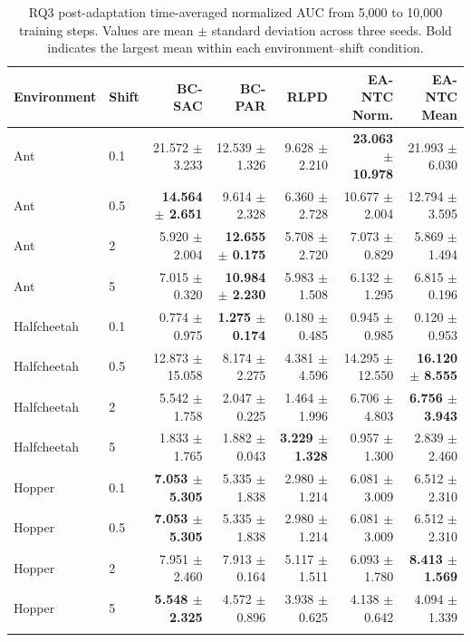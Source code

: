 \begin{table}[t]
\centering
\caption{RQ3 post-adaptation time-averaged normalized AUC from 5,000 to 10,000 training steps. Values are mean $\pm$ standard deviation across three seeds. Bold indicates the largest mean within each environment--shift condition.}
\label{tab:rq3_post_adaptation_auc}
\small
\setlength{\tabcolsep}{4pt}
\begin{tabular}{llrrrrr}
\toprule
Environment & Shift & BC-SAC & BC-PAR & RLPD & EA-NTC Norm. & EA-NTC Mean \\
\midrule
Ant & 0.1 & 21.572 $\pm$ 3.233 & 12.539 $\pm$ 1.326 & 9.628 $\pm$ 2.210 & \textbf{23.063 $\pm$ 10.978} & 21.993 $\pm$ 6.030 \\
Ant & 0.5 & \textbf{14.564 $\pm$ 2.651} & 9.614 $\pm$ 2.328 & 6.360 $\pm$ 2.728 & 10.677 $\pm$ 2.004 & 12.794 $\pm$ 3.595 \\
Ant & 2 & 5.920 $\pm$ 2.004 & \textbf{12.655 $\pm$ 0.175} & 5.708 $\pm$ 2.720 & 7.073 $\pm$ 0.829 & 5.869 $\pm$ 1.494 \\
Ant & 5 & 7.015 $\pm$ 0.320 & \textbf{10.984 $\pm$ 2.230} & 5.983 $\pm$ 1.508 & 6.132 $\pm$ 1.295 & 6.815 $\pm$ 0.196 \\
\addlinespace
Halfcheetah & 0.1 & 0.774 $\pm$ 0.975 & \textbf{1.275 $\pm$ 0.174} & 0.180 $\pm$ 0.485 & 0.945 $\pm$ 0.985 & 0.120 $\pm$ 0.953 \\
Halfcheetah & 0.5 & 12.873 $\pm$ 15.058 & 8.174 $\pm$ 2.275 & 4.381 $\pm$ 4.596 & 14.295 $\pm$ 12.550 & \textbf{16.120 $\pm$ 8.555} \\
Halfcheetah & 2 & 5.542 $\pm$ 1.758 & 2.047 $\pm$ 0.225 & 1.464 $\pm$ 1.996 & 6.706 $\pm$ 4.803 & \textbf{6.756 $\pm$ 3.943} \\
Halfcheetah & 5 & 1.833 $\pm$ 1.765 & 1.882 $\pm$ 0.043 & \textbf{3.229 $\pm$ 1.328} & 0.957 $\pm$ 1.300 & 2.839 $\pm$ 2.460 \\
\addlinespace
Hopper & 0.1 & \textbf{7.053 $\pm$ 5.305} & 5.335 $\pm$ 1.838 & 2.980 $\pm$ 1.214 & 6.081 $\pm$ 3.009 & 6.512 $\pm$ 2.310 \\
Hopper & 0.5 & \textbf{7.053 $\pm$ 5.305} & 5.335 $\pm$ 1.838 & 2.980 $\pm$ 1.214 & 6.081 $\pm$ 3.009 & 6.512 $\pm$ 2.310 \\
Hopper & 2 & 7.951 $\pm$ 2.460 & 7.913 $\pm$ 0.164 & 5.117 $\pm$ 1.511 & 6.093 $\pm$ 1.780 & \textbf{8.413 $\pm$ 1.569} \\
Hopper & 5 & \textbf{5.548 $\pm$ 2.325} & 4.572 $\pm$ 0.896 & 3.938 $\pm$ 0.625 & 4.138 $\pm$ 0.642 & 4.094 $\pm$ 1.339 \\
\addlinespace

\end{tabular}
\end{table}
